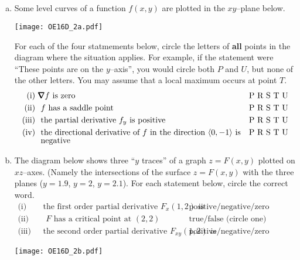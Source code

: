 


\subsection*{\Conceptual}

\begin{question}[M200 2016D] %
\begin{enumerate}[(a)]
\item
Some level curves of a function $f(x,y)$ are plotted in the $xy$--plane 
below. 

\begin{center}
     \texttt{[image: OE16D\_2a.pdf]}
\end{center}

For each of the four statmements below, circle the letters of
\textbf{all} points in the diagram where the situation applies.
For example, if the statement were ``These points are on the $y$--axis'', you would circle both $P$ and $U$, but none of the other letters.
You may assume that a local maximum occurs at point $T$. 
\begin{align*}
\text{(i) }& \vnabla f\text{ is zero} & &\text{P R S T U} \\
\text{(ii) }& \text{ $f$ has a saddle point} & &\text{P R S T U} \\
\text{(iii) }& \text{ the partial derivative $f_y$ is positive} & &\text{P R S T U} \\
\text{(iv) }& \text{ the directional derivative of $f$ in the 
                 direction $\llt 0,-1\rgt$ is} & &\text{P R S T U} \\[-0.07in]
          & \text{ negative} & & 
\end{align*}


\item
The diagram below shows three ``$y$ traces'' of a graph $z=F(x,y)$ plotted
on $xz$--axes. (Namely the intersections of the surface  $z=F(x,y)$ with the 
three planes ($y=1.9$, $y=2$, $y=2.1$). For each statement below, circle the
correct word.
\begin{align*}
\text{(i) }& \text{ the first order partial derivative $F_x(1,2)$ is} & &\text{positive/negative/zero (circle one)} \\
\text{(ii) }& \text{ $F$ has a critical point at $(2,2)$ } & 
         &\text{true/false (circle one)} \\
\text{(iii) }& \text{ the second order partial derivative $F_{xy}(1,2)$ is} & &\text{positive/negative/zero (circle one)} 
\end{align*}

\begin{center}
     \texttt{[image: OE16D\_2b.pdf]}
\end{center}
\end{enumerate}
\end{question}


